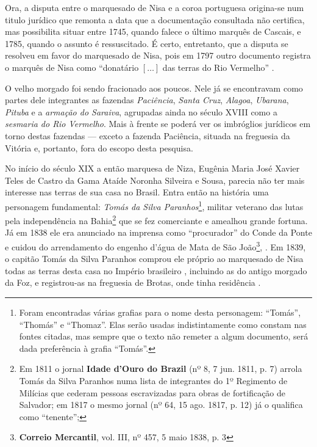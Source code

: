 Ora, a disputa entre o marquesado de Nisa e a coroa portuguesa origina-se num titulo jurídico que remonta a data que a documentação consultada não certifica, mas possibilita situar entre 1745, quando falece o último marquês de Cascais, e 1785, quando o assunto é ressuscitado. É certo, entretanto, que a disputa se resolveu em favor do marquesado de Nisa, pois em 1797 outro documento registra o marquês de Nisa como ``donatário \([\dots]\) das terras do Rio Vermelho'' \cite[p.~543]{ramiz_expos_1881}.

O velho morgado foi sendo fracionado aos poucos. Nele já se encontravam como partes dele integrantes as fazendas \textit{Paciência}, \textit{Santa Cruz}, \textit{Alagoa}, \textit{Ubarana}, \textit{Pituba} e a \textit{armação do Saraiva}, agrupadas ainda no século XVIII como a \textit{sesmaria do Rio Vermelho}. Mais à frente se poderá ver os imbróglios jurídicos em torno destas fazendas --- exceto a fazenda Paciência, situada na freguesia da Vitória e, portanto, fora do escopo desta pesquisa. 

No início do século XIX a então marquesa de Niza, Eugênia Maria José Xavier Teles de Castro da Gama Ataíde Noronha Silveira e Sousa, parecia não ter mais interesse nas terras de sua casa no Brasil. Entra então na história uma personagem fundamental: \textit{Tomás da Silva Paranhos}\footnote{Foram encontradas várias grafias para o nome desta personagem: ``Tomás'', ``Thomás'' e ``Thomaz''. Elas serão usadas indistintamente como constam nas fontes citadas, mas sempre que o texto não remeter a algum documento, será dada preferência à grafia ``Tomás''.}, militar veterano das lutas pela independência na Bahia\footnote{Em 1811 o jornal \textbf{Idade d'Ouro do Brazil} (nº 8, 7 jun. 1811, p. 7) arrola Tomás da Silva Paranhos numa lista de integrantes do 1º Regimento de Milícias que cederam pessoas escravizadas para obras de fortificação de Salvador; em 1817 o mesmo jornal (nº 64, 15 ago. 1817, p. 12) já o qualifica como ``tenente''; } que se fez comerciante e amealhou grande fortuna. Já em 1838 ele era anunciado na imprensa como ``procurador'' do Conde da Ponte e cuidou do arrendamento do engenho d'água de Mata de São João\footnote{\textbf{Correio Mercantil}, vol. III, nº 457, 5 maio 1838, p. 3}, . Em 1839, o capitão Tomás da Silva Paranhos comprou ele próprio ao marquesado de Nisa todas as terras desta casa no Império brasileiro \cite[pp.~III-7 - III-12]{teixeira_doacoes_1978}, incluindo as do antigo morgado da Foz, e registrou-as na freguesia de Brotas, onde tinha residência \cite[p.~10]{ott_engenhos_1996}.

